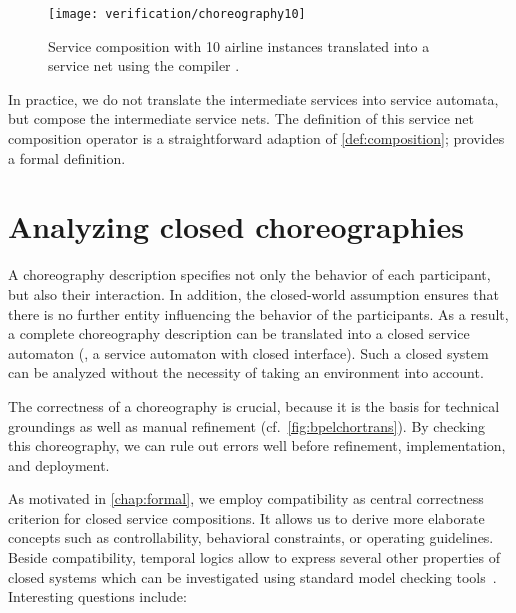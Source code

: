 \begin{figure}[tb]
\centering
\texttt{[image: verification/choreography10]}
\caption{Service composition with 10 airline instances translated into a service net using the compiler \bpelowfn.}\label{fig:choreography10}%
\end{figure}

In practice, we do not translate the intermediate  services into service automata, but compose the intermediate service nets. The definition of this service net composition operator is a straightforward adaption of \autoref{def:composition}; \citet{Wolf_2007_sa} provides a formal definition.





\section{Analyzing closed choreographies}\label{sec:Analysis}

A \bpelchor{} choreography description specifies not only the behavior of each participant, but also their interaction. In addition, the \mbox{closed-world} assumption ensures that there is no further entity influencing the behavior of the participants. As a result, a complete \bpelchor{} choreography description can be translated into a closed service automaton (\ie, a service automaton with closed interface). Such a closed system can be analyzed without the necessity of taking an environment into account.

The correctness of a \bpelchor{} choreography is crucial, because it is the basis for technical groundings as well as manual refinement (cf.~\autoref{fig:bpelchortrans}). By checking this \bpelchor{} choreography, we can rule out errors well before refinement, implementation, and deployment.

As motivated in \autoref{chap:formal}, we employ compatibility as central correctness criterion for closed service compositions. It allows us to derive more elaborate concepts such as controllability, behavioral constraints, or operating guidelines. Beside compatibility, temporal logics allow to express several other properties of closed systems which can be investigated using standard model checking tools~\cite{ClarkeGD_1999_book,BaierK_2008_book}. Interesting questions include:

